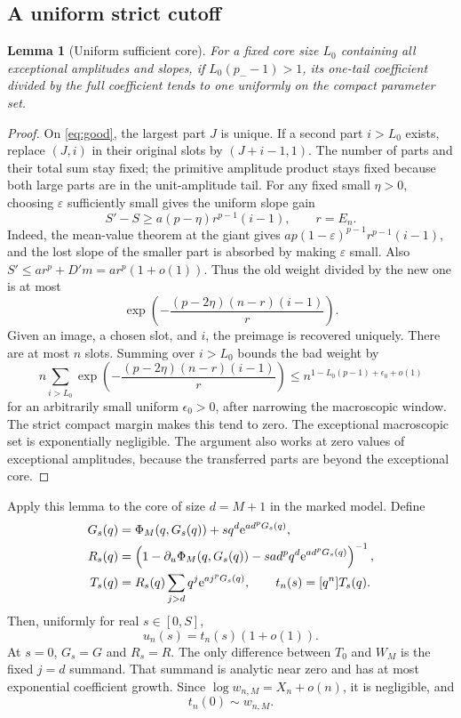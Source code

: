 \documentclass[11pt,a4paper]{article}
\numberwithin{equation}{section}
\newtheorem{lemma}[theorem]{Lemma}
\theoremstyle{definition}
\theoremstyle{remark}
\newcommand{\ee}{\mathrm e}\newcommand{\dd}{\mathrm d}
\begin{document}
\subsection{A uniform strict cutoff}
\begin{lemma}[Uniform sufficient core]
\label{lem:cutoff}
For a fixed core size $L_0$ containing all exceptional amplitudes and slopes,
if $L_0(p_--1)>1$, its one-tail coefficient divided by the full coefficient
tends to one uniformly on the compact parameter set.
\end{lemma}
\begin{proof}
On \eqref{eq:good}, the largest part $J$ is unique. If a second part
$i>L_0$ exists, replace $(J,i)$ in their original slots by $(J+i-1,1)$.
The number of parts and their total sum stay fixed; the primitive amplitude
product stays fixed because both large parts are in the unit-amplitude tail.
For any fixed small $\eta>0$, choosing $\varepsilon$ sufficiently small
gives the uniform slope gain
\[
 S'-S\ge a(p-\eta)r^{p-1}(i-1),\qquad r=E_n.
\]
Indeed, the mean-value theorem at the giant gives
$ap(1-\varepsilon)^{p-1}r^{p-1}(i-1)$, and the lost slope of the smaller
part is absorbed by making $\varepsilon$ small. Also
$S'\le a r^p+D'm=a r^p(1+o(1))$. Thus the old weight divided by the
new one is at most
\[
 \exp\left(-\frac{(p-2\eta)(n-r)(i-1)}{r}\right).
\]
Given an image, a chosen slot, and $i$, the preimage is recovered uniquely.
There are at most $n$ slots. Summing over $i>L_0$ bounds the bad weight by
\[
 n\sum_{i>L_0}
 \exp\left(-\frac{(p-2\eta)(n-r)(i-1)}r\right)
 \le n^{1-L_0(p-1)+\epsilon_0+o(1)}
\]
for an arbitrarily small uniform $\epsilon_0>0$, after narrowing the
macroscopic window. The strict compact margin makes this tend to zero.
The exceptional macroscopic set is exponentially negligible. The argument
also works at zero values of exceptional amplitudes, because the transferred
parts are beyond the exceptional core.
\end{proof}

Apply this lemma to the core of size $d=M+1$ in the marked model. Define
\begin{align}
 G_s(q)&=\Phi_M(q,G_s(q))+s q^d\ee^{a d^pG_s(q)},\notag\\
 R_s(q)&=\left(1-\partial_u\Phi_M(q,G_s(q))
               -s a d^p q^d\ee^{a d^pG_s(q)}\right)^{-1},\notag\\
 T_s(q)&=R_s(q)\sum_{j>d}q^j\ee^{a j^pG_s(q)},\qquad
 t_n(s)=[q^n]T_s(q).
 \label{eq:augmented}
\end{align}
Then, uniformly for real $s\in[0,S]$,
\begin{equation}
 u_n(s)=t_n(s)(1+o(1)).
 \label{eq:uniform-reduction}
\end{equation}
At $s=0$, $G_s=G$ and $R_s=R$. The only difference between $T_0$ and
$W_M$ is the fixed $j=d$ summand. That summand is analytic near zero and
has at most exponential coefficient growth. Since $\log w_{n,M}=X_n+o(n)$,
it is negligible, and
\begin{equation}
 t_n(0)\sim w_{n,M}.
 \label{eq:Tzero}
\end{equation}
\end{document}

